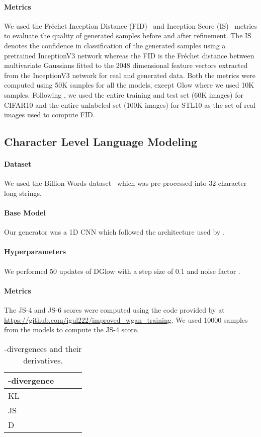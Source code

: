 \documentclass{article} \usepackage{iclr2021_conference,times}
\newcommand{\ourmethod}{\textsc{DG}low}
\begin{document}
\paragraph{Metrics}  We used the Fr\'echet Inception Distance (FID)~\citep{heusel2017gans} and Inception Score (IS)~\citep{salimans2016improved} metrics to evaluate the quality of generated samples before and after refinement. The IS denotes the confidence in classification of the generated samples using a pretrained InceptionV3 network whereas the FID is the Fr\'echet distance between multivariate Gaussians fitted to the 2048 dimensional feature vectors extracted from the InceptionV3 network for real and generated data. Both the metrics were computed using 50K samples for all the models, except Glow where we used 10K samples. Following \citet{tanaka2019discriminator}, we used the entire training and test set (60K images) for CIFAR10 and the entire unlabeled set (100K images) for STL10 as the set of real images used to compute FID.

\subsection{Character Level Language Modeling}
\paragraph{Dataset} We used the Billion Words dataset~\citep{chelba2013one} which was pre-processed into 32-character long strings.

\paragraph{Base Model} Our generator was a 1D CNN which followed the architecture used by \citet{gulrajani2017improved}.
\paragraph{Hyperparameters} We performed 50 updates of \ourmethod{} with a step size of 0.1 and noise factor .
\paragraph{Metrics} The JS-4 and JS-6 scores were computed using the code provided by \citet{gulrajani2017improved} at \url{https://github.com/igul222/improved_wgan_training}. We used 10000 samples from the models to compute the JS-4 score.


\begin{table*}
	\centering
	\footnotesize
	\caption{\small -divergences and their derivatives.}
	\label{tab:f-divergences}
	\begin{tabular}{llll}
		\toprule
		-divergence & \multicolumn{1}{c}{} & \multicolumn{1}{c}{} & \multicolumn{1}{c}{}\\
		\midrule
		KL          &  &  &  \\
		JS          &  &  &  \\
		 D    &  &  &  \\
		\bottomrule
	\end{tabular}
\end{table*}
\end{document}

